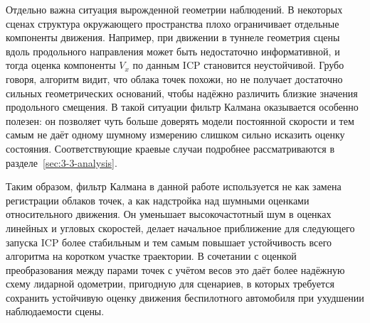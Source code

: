 Отдельно важна ситуация вырожденной геометрии наблюдений. В некоторых сценах структура окружающего пространства плохо ограничивает отдельные компоненты движения. Например, при движении в туннеле геометрия сцены вдоль продольного направления может быть недостаточно информативной, и тогда оценка компоненты $V_x$ по данным ICP становится неустойчивой. Грубо говоря, алгоритм видит, что облака точек похожи, но не получает достаточно сильных геометрических оснований, чтобы надёжно различить близкие значения продольного смещения. В такой ситуации фильтр Калмана оказывается особенно полезен: он позволяет чуть больше доверять модели постоянной скорости и тем самым не даёт одному шумному измерению слишком сильно исказить оценку состояния. Соответствующие краевые случаи подробнее рассматриваются в разделе~\ref{sec:3-3-analysis}.

Таким образом, фильтр Калмана в данной работе используется не как замена регистрации облаков точек, а как надстройка над шумными оценками относительного движения. Он уменьшает высокочастотный шум в оценках линейных и угловых скоростей, делает начальное приближение для следующего запуска ICP более стабильным и тем самым повышает устойчивость всего алгоритма на коротком участке траектории. В сочетании с оценкой преобразования между парами точек с учётом весов это даёт более надёжную схему лидарной одометрии, пригодную для сценариев, в которых требуется сохранить устойчивую оценку движения беспилотного автомобиля при ухудшении наблюдаемости сцены.

